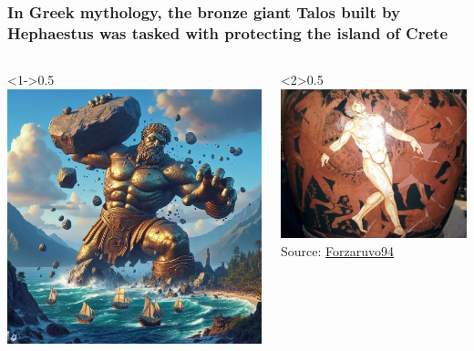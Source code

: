 \documentclass{beamer}
\begin{document}
\begin{frame}
  \frametitle{In Greek mythology, the bronze giant Talos built by Hephaestus was tasked with protecting the island of Crete}  
  \begin{columns}
    \begin{column}<1->{0.5\textwidth}
      \includegraphics[width=\textwidth]{Talos_AIGen.jpeg}
    \end{column}
    \begin{column}<2>{0.5\textwidth}
      \includegraphics[width=\textwidth]{Talos_death.jpg}
      Source: \href{https://commons.wikimedia.org/wiki/File:Vaso_di_Talos_particolare.JPG}{Forzaruvo94}
    \end{column}
  \end{columns}
  

\end{frame}
\end{document}
